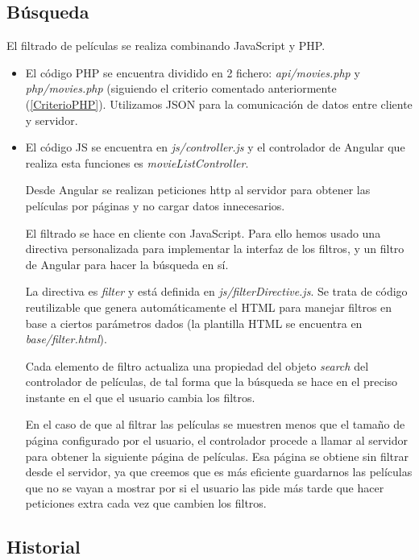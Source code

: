 \documentclass{apuntes}
\begin{document}
\subsection{Búsqueda}
El filtrado de películas se realiza combinando JavaScript y PHP. 

\begin{itemize}
\item El código PHP se encuentra dividido en 2 fichero: \textit{api/movies.php} y \textit{php/movies.php} (siguiendo el criterio comentado anteriormente (\ref{CriterioPHP}). Utilizamos JSON para la comunicación de datos entre cliente y servidor.

\item El código JS se encuentra en \textit{js/controller.js} y el controlador de Angular que realiza esta funciones es \textit{movieListController}.

Desde Angular se realizan peticiones http al servidor para obtener las películas por páginas y no cargar datos innecesarios.

El filtrado se hace en cliente con JavaScript. Para ello hemos usado una directiva personalizada para implementar la interfaz de los filtros, y un filtro de Angular para hacer la búsqueda en sí.

La directiva es \textit{filter} y está definida en \textit{js/filterDirective.js}. Se trata de código reutilizable que genera automáticamente el HTML para manejar filtros en base a ciertos parámetros dados (la plantilla HTML se encuentra en \textit{base/filter.html}).

Cada elemento de filtro actualiza una propiedad del objeto \textit{search} del controlador de películas, de tal forma que la búsqueda se hace en el preciso instante en el que el usuario cambia los filtros.

En el caso de que al filtrar las películas se muestren menos que el tamaño de página configurado por el usuario, el controlador procede a llamar al servidor para obtener la siguiente página de películas. Esa página se obtiene sin filtrar desde el servidor, ya que creemos que es más eficiente guardarnos las películas que no se vayan a mostrar por si el usuario las pide más tarde que hacer peticiones extra cada vez que cambien los filtros.
\end{itemize}



\subsection{Historial}
\end{document}
